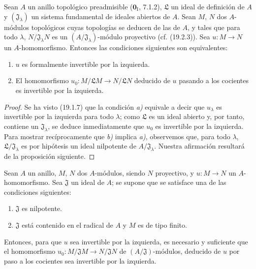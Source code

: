\begin{proposition}[19.1.9]
\label{0.19.1.9-fr}
Sean $A$ un anillo topológico \textup{preadmisible ($\mathbf{0}_{\mathrm I}$,
7.1.2)}, $\mathfrak L$ un ideal de definición de $A$ y
$(\mathfrak J_\lambda)$ un sistema fundamental de ideales abiertos de $A$.
Sean $M$, $N$ dos $A$-módulos topológicos cuyas topologías se deducen
de las de $A$, y tales que para todo $\lambda$,
$N/\mathfrak J_\lambda N$ es un $(A/\mathfrak J_\lambda)$-módulo proyectivo
\textup{(cf. (19.2.3))}. Sea $u:M\to N$ un $A$-homomorfismo. Entonces las condiciones
siguientes son equivalentes:
\begin{enumerate}
  
\item[\textup{a)}] $u$ es formalmente invertible por la izquierda.

  

  \item[\textup{b)}] El homomorfismo
  $u_0:M/\mathfrak LM\to N/\mathfrak LN$ deducido de $u$ pasando a los
  cocientes es invertible por la izquierda.
\end{enumerate}
\end{proposition}

\begin{proof}
Se ha visto (19.1.7) que la condición \emph{a)} equivale a decir que $u_\lambda$ es
invertible por la izquierda para todo $\lambda$; como $\mathfrak L$ es un ideal
abierto y, por tanto, contiene un $\mathfrak J_\lambda$, se deduce inmediatamente que
$u_0$ es invertible por la izquierda. Para mostrar recíprocamente que \emph{b)} implica \emph{a)},
observemos que, para todo $\lambda$, $\mathfrak L/\mathfrak J_\lambda$ es por
hipótesis un ideal nilpotente de $A/\mathfrak J_\lambda$. Nuestra afirmación
resultará de la proposición siguiente.
\end{proof}

\begin{proposition}[19.1.10]
\label{0.19.1.10-fr}
Sean $A$ un anillo, $M$, $N$ dos $A$-módulos, siendo $N$ proyectivo, y
$u:M\to N$ un $A$-homomorfismo. Sea $\mathfrak J$ un ideal de $A$; se
supone que se satisface \textup{una} de las condiciones siguientes:
\begin{enumerate}
  \item[\textup{(i)}] $\mathfrak J$ es nilpotente.
  \item[\textup{(ii)}] $\mathfrak J$ está contenido en el radical de $A$ y $M$ es de
  tipo finito.
\end{enumerate}
Entonces, para que $u$ sea invertible por la izquierda, es necesario y suficiente que
el homomorfismo
$u_0:M/\mathfrak JM\to N/\mathfrak JN$ de $(A/\mathfrak J)$-módulos, deducido
de $u$ por paso a los cocientes sea invertible por la izquierda.
\end{proposition}

